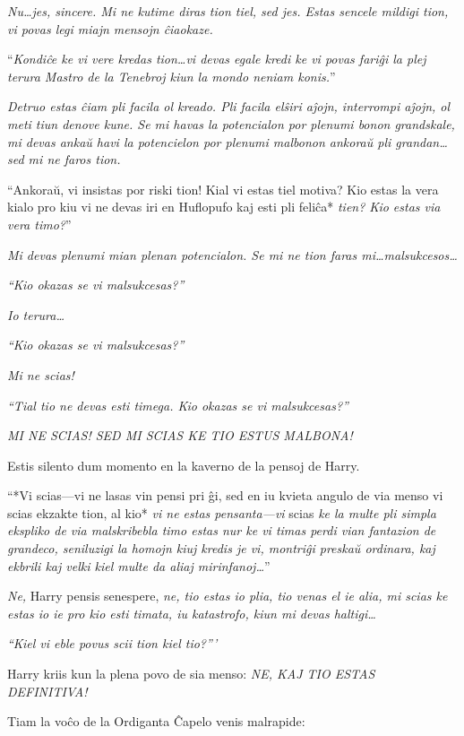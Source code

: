 \emph{Nu\ldots jes, sincere. Mi ne kutime diras tion tiel, sed
  jes. Estas sencele mildigi tion, vi povas legi miajn mensojn
  ĉiaokaze.}

``\emph{Kondiĉe ke vi vere kredas tion\ldots vi devas egale kredi ke
  vi povas fariĝi la plej terura Mastro de la Tenebroj kiun la mondo
  neniam konis.}''

\emph{Detruo estas ĉiam pli facila ol kreado. Pli facila elŝiri aĵojn,
  interrompi aĵojn, ol meti tiun denove kune. Se mi havas la
  potencialon por plenumi bonon grandskale, mi devas ankaŭ havi la
  potencielon por plenumi malbonon ankoraŭ pli grandan\ldots sed mi ne
  faros tion.}

``Ankoraŭ, vi insistas por riski tion! Kial vi estas tiel motiva?  Kio
estas la vera kialo pro kiu vi ne devas iri en Huflopufo kaj esti pli
feliĉa* \emph{tien? Kio estas via vera timo?}''


\emph{Mi devas plenumi mian plenan potencialon. Se mi ne tion faras
  mi\ldots malsukcesos\ldots}

\emph{``Kio okazas se vi malsukcesas?''}

\emph{Io terura\ldots}

\emph{``Kio okazas se vi malsukcesas?''}

\emph{Mi ne scias!}

\emph{``Tial tio ne devas esti timega. Kio okazas se vi malsukcesas?''}

\emph{MI NE SCIAS! SED MI SCIAS KE TIO ESTUS MALBONA!}

Estis silento dum momento en la kaverno de la pensoj de Harry.

``*Vi scias—vi ne lasas vin pensi pri ĝi, sed en iu kvieta angulo de
via menso vi scias ekzakte tion, al kio* \emph{vi ne estas
  pensanta—vi} scias \emph{ke la multe pli simpla ekspliko de via
  malskribebla timo estas nur ke vi timas perdi vian fantazion de
  grandeco, seniluzigi la homojn kiuj kredis je vi, montriĝi preskaŭ
  ordinara, kaj ekbrili kaj velki kiel multe da aliaj
  mirinfanoj\ldots}''

\emph{Ne,} Harry pensis senespere, \emph{ne, tio estas io plia, tio
  venas el ie alia, mi scias ke estas io ie pro kio esti timata, iu
  katastrofo, kiun mi devas haltigi\ldots}

\emph{``Kiel vi eble povus scii tion kiel tio?'''}

Harry kriis kun la plena povo de sia menso: \emph{NE, KAJ TIO ESTAS
  DEFINITIVA!}

Tiam la voĉo de la Ordiganta Ĉapelo venis malrapide:

